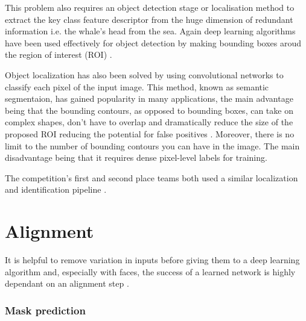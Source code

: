 \documentclass{IET}%
\begin{document}
This problem also requires an object detection stage or localisation method to extract the key class feature descriptor from the huge dimension of redundant information i.e. the whale's head from the sea. Again deep learning algorithms have been used effectively for object detection by making bounding boxes aroud the region of interest (ROI) \cite{girshick2015fast,girshick2014rich}. 

Object localization has also been solved by using convolutional networks to classify each pixel of the input image. This method, known as semantic segmentaion, has gained popularity in many applications, the main advantage being that the bounding contours, as opposed to bounding boxes, can take on complex shapes, don't have to overlap and dramatically reduce the size of the proposed ROI reducing the potential for false positives \cite{sermanet2013overfeat}. Moreover, there is no limit to the number of bounding contours you can have in the image. The main disadvantage being that it requires dense pixel-level labels for training.

The competition's first and second place teams both used a similar localization and identification pipeline \cite{w1st}.

\section{Alignment}

It is helpful to remove variation in inputs before giving them to a deep learning algorithm and, especially with faces, the success of a learned network is highly dependant on an alignment step \cite{lecun2012efficient,taigman2014deepface}. 

\subsubsection{Mask prediction}
\end{document}
